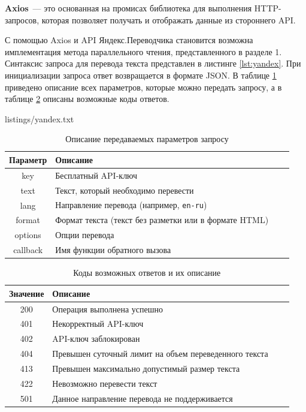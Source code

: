 \textbf{Axios}~--- это основанная на промисах библиотека для выполнения HTTP-запросов, которая позволяет получать и отображать данные из стороннего API.

С помощью Axios и API Яндекс.Переводчика \cite{yandex} становится возможна имплементация метода параллельного чтения, представленного в разделе 1. Синтаксис запроса для перевода текста представлен в листинге \ref{lst:yandex}. При инициализации запроса ответ возвращается в формате JSON. В таблице \ref{tab:tab2} приведено описание всех параметров, которые можно передать запросу, а в таблице \ref{tab:tab3} описаны возможные коды ответов.


{listings/yandex.txt}

\begin{table}[h]
	\centering
	\begin{tabular}{ |c|l|c|c| }
		\hline
		Параметр & Описание \\
		\hline
		key & Бесплатный API-ключ \\
		\hline
		text & Текст, который необходимо перевести \\
		\hline
		lang & Направление перевода (например, \texttt{en-ru}) \\
		\hline
		format & Формат текста (текст без разметки или в формате HTML) \\
		\hline
		options & Опции перевода \\ 
		\hline
		callback & Имя функции обратного вызова \\ 
		\hline
	\end{tabular}
	\caption{Описание передаваемых параметров запросу}
	\label{tab:tab2}
\end{table}

\begin{table}[h]
	\centering
	\begin{tabular}{ |c|l|c|c| }
		\hline
		Значение & Описание \\
		\hline
		200 & Операция выполнена успешно \\
		\hline
		401 & Некорректный API-ключ \\
		\hline
		402 & API-ключ заблокирован \\
		\hline
		404 & Превышен суточный лимит на объем переведенного текста \\
		\hline
		413 & Превышен максимально допустимый размер текста \\ 
		\hline
		422 & Невозможно перевести текст \\ 
		\hline
		501 & Данное направление перевода не поддерживается \\ 
		\hline
	\end{tabular}
	\caption{Коды возможных ответов и их описание}
	\label{tab:tab3}
\end{table}

